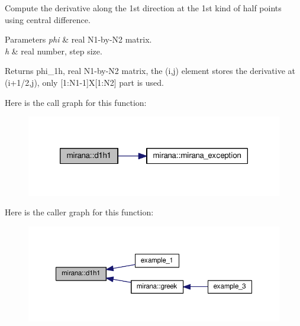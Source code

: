 Compute the derivative along the 1st direction at the 1st kind of half points using central difference. 


\begin{DoxyParams}{Parameters}
{\em phi} & real N1-\/by-\/\-N2 matrix. \\
\hline
{\em h} & real number, step size. \\
\hline
\end{DoxyParams}
\begin{DoxyReturn}{Returns}
phi\-\_\-1h, real N1-\/by-\/\-N2 matrix, the (i,j) element stores the derivative at (i+1/2,j), only \mbox{[}1\-:N1-\/1\mbox{]}X\mbox{[}1\-:N2\mbox{]} part is used. 
\end{DoxyReturn}


Here is the call graph for this function\-:\nopagebreak
\begin{figure}[H]
\begin{center}
\leavevmode
\includegraphics[width=318pt]{classmirana_acc84c99770972f6328e89ac04ac67153_cgraph}
\end{center}
\end{figure}




Here is the caller graph for this function\-:\nopagebreak
\begin{figure}[H]
\begin{center}
\leavevmode
\includegraphics[width=350pt]{classmirana_acc84c99770972f6328e89ac04ac67153_icgraph}
\end{center}
\end{figure}


